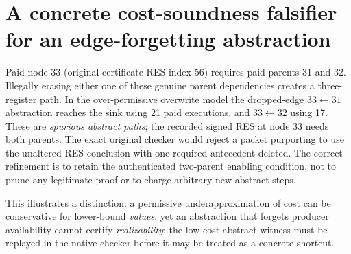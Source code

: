 \documentclass[11pt]{article}
\begin{document}
\section*{A concrete cost-soundness falsifier for an edge-forgetting abstraction}
Paid node 33 (original certificate RES index 56) requires paid parents 31 and 32. Illegally erasing either one of these genuine parent dependencies creates a three-register path. In the over-permissive overwrite model the dropped-edge \(33\leftarrow31\) abstraction reaches the sink using 21 paid executions, and \(33\leftarrow32\) using 17. These are \emph{spurious abstract paths}; the recorded signed RES at node 33 needs both parents. The exact original checker would reject a packet purporting to use the unaltered RES conclusion with one required antecedent deleted. The correct refinement is to retain the authenticated two-parent enabling condition, not to prune any legitimate proof or to charge arbitrary new abstract steps.

This illustrates a distinction: a permissive underapproximation of cost can be conservative for lower-bound \emph{values}, yet an abstraction that forgets producer availability cannot certify \emph{realizability}; the low-cost abstract witness must be replayed in the native checker before it may be treated as a concrete shortcut.
\end{document}
